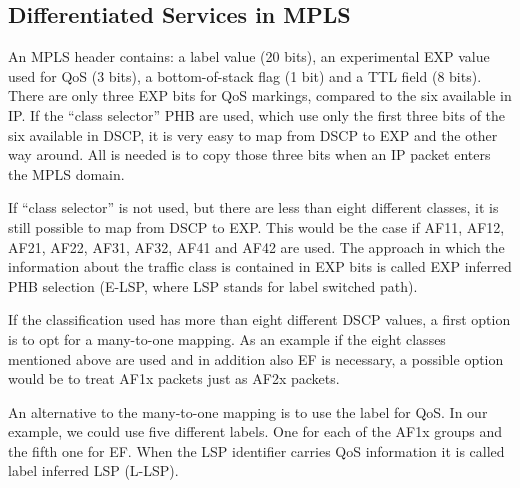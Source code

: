 \subsection{Differentiated Services in MPLS}
An MPLS header contains: a label value (20 bits), an experimental EXP value used for QoS (3 bits), a bottom-of-stack flag (1 bit)  and a TTL field (8 bits).
There are only three EXP bits for QoS markings, compared to the six available in IP.
If the ``class selector'' PHB are used, which use only the first three bits of the six available in DSCP, it is very easy to map from DSCP to EXP and the other way around.
All is needed is to copy those three bits when an IP packet enters the MPLS domain.

If ``class selector'' is not used, but there are less than eight different classes, it is still possible to map from DSCP to EXP.
This would be the case if AF11, AF12, AF21, AF22, AF31, AF32, AF41 and AF42 are used.
The approach in which the information about the traffic class is contained in EXP bits is called EXP inferred PHB selection (E-LSP, where LSP stands for label switched path).

If the classification used has more than eight different DSCP values, a first option is to opt for a many-to-one mapping.
As an example if the eight classes mentioned above are used and in addition also EF is necessary, a possible option would be to treat AF1x packets just as AF2x packets.

An alternative to the many-to-one mapping is to use the label for QoS.
In our example, we could use five different labels.
One for each of the AF1x groups and the fifth one for EF.
When the LSP identifier carries QoS information it is called label inferred LSP (L-LSP).

